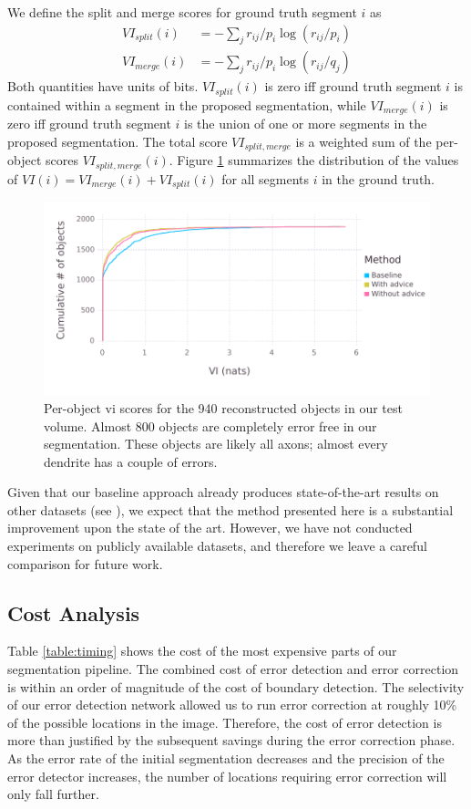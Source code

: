 \documentclass{article}
\begin{document}
We define the split and merge scores for ground truth segment $i$ as
\begin{align*}
	VI_{split}(i) &= -\sum_j r_{ij}/p_i \log(r_{ij}/p_i)\\
	VI_{merge}(i) &= -\sum_j r_{ij}/p_i \log(r_{ij}/q_j)
\end{align*}
Both quantities have units of bits. $VI_{split}(i)$ is zero iff ground truth segment $i$ is contained within a segment in the proposed segmentation, while $VI_{merge}(i)$ is zero iff ground truth segment $i$ is the union of one or more segments in the proposed segmentation. The total score $VI_{split, merge}$ is a weighted sum of the per-object scores $VI_{split,merge}(i)$. Figure \ref{fig:decomp_vi_scores} summarizes the distribution of the values of $VI(i)=VI_{merge}(i)+VI_{split}(i)$ for all segments $i$ in the ground truth.
\begin{figure}
\begin{center}
\includegraphics[width=0.65\linewidth]{per_object_vi.pdf}
\caption{Per-object vi scores for the 940 reconstructed objects in our test volume. Almost 800 objects are completely error free in our segmentation. These objects are likely all axons; almost every dendrite has a couple of errors.}
\label{fig:decomp_vi_scores}
\end{center}
\end{figure}

Given that our baseline approach already produces state-of-the-art results on other datasets (see \cite{kisuk}), we expect that the method presented here is a substantial improvement upon the state of the art. However, we have not conducted experiments on publicly available datasets, and therefore we leave a careful comparison for future work.

\subsection{Cost Analysis}
Table \ref{table:timing} shows the cost of the most expensive parts of our segmentation pipeline. The combined cost of error detection and error correction is within an order of magnitude of the cost of boundary detection. The selectivity of our error detection network allowed us to run error correction at roughly 10\% of the possible locations in the image. Therefore, the cost of error detection is more than justified by the subsequent savings during the error correction phase. As the error rate of the initial segmentation decreases and the precision of the error detector increases, the number of locations requiring error correction will only fall further.
\end{document}
